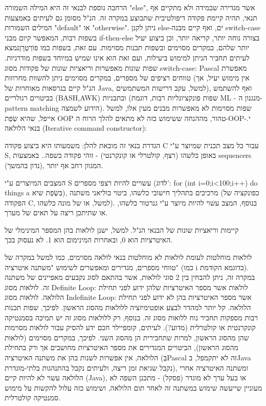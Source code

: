         הרחבה נוספת לבנאי זה היא המילה השמורה "else", אשר מגדירה שבמידה ולא מתקיים אף
        תנאי, תהיה קיימת פקודה דיפולטיבית שתבוצע במקרה זה. הנ"ל מסומן גם לעיתים באמצעות
        המילים השמורות "default" או "otherwise". ניתן לקנן else-ים, ואף קיים מבנה
        switch-case בשפות רבות, המאפשר קיום מבני if-then-else בצורה נוחה יותר, קריאה
        יותר, וכן ביצוע יעיל יותר שלהם, במקרים מסוימים ובשפות תכנות מסוימות. עם זאת,
        בשפות כמו פוֹרְטְרָןנמצא לעיתים תחביר הניתן למימוש ביעילות, ועם זאת הוא אינו שמיש
        במיוחד בשפות מודרניות. שפות שונות מאפשרות וריאציות שונות של פקודות מסוג
        switch-case: Pascal מאפשרת טווחים רציפים של מספרים, במקרים מסוימים ניתן להשוות
        מחרוזות (אין מימוש יעיל, אך הנ"ל קיים בגרסאות מאוחרות של Java, למשל, עקב דרישות
        המשתמשים), ואף להשתמש בביטויים רגולריים (BASH,AWK) ובתבניות (שפות פונקציונליות
        רבות, דוגמת ML - מנגנון ה- pattern matching הידוע לשמצה). שפות מסוימות לא
        מאפשרות מבנים מעין אלו, למשל אייפל, שהיא שְׂפַת OOP טהור, מההנחה ששימוש כזה לא
        מתאים להלך הרוח ה-OOP-י.
        בנאי הלולאה (Iterative command constructor):

        הגדרת בנאי זה מובאת להלן:
        משמעותו היא ביצוע פקודה C עבור כל מצב תכנית שמיוצר ע"י S, באופן כלשהו (רצף,
        קולטרלי או קונקרנטי) - זוהי פקודה בשפה.. באמצעות sequencers (נדון בהמשך),
        המגוון רחב אף יותר.

        המצבים המיוצרים ע"י S עשויים להיות רצפי מספרים (לדוג': for (int i=0;i<100;i++)
        {do things} a בִּשְׂפַת שיא), מרכיבים בתהליך חישובי כלשהו, ביטוי בוליאני משתנה
        (כפונקציה של הפקודה C, למשל, או של מונה כלשהו). בנוסף, המצב עשוי להיות מיוצר
        ע"י גנרטור כלשהו, או שתיתכן ריצה על תאים של מערך.

        קיימות וריאציות שונות של הבנאי הנ"ל. למשל, ישנן לולאות בהן המספר המינימלי של
        האיטרציות הוא 0, ובאחרות המינימום הוא 1. לא נעסוק בכך.

        לולאות מוחלטות לעומת לולאות לא מוחלטות
        בנאי לולאה מסוימים, כמו למשל במקרה של טווחי מספרים, מגדירים ומאפשרים לשימוש
        "משתנה איטרציה" (כמו i בדוגמא הקודמת). במקרה זה, ניתן להבחין בין 2 סוגי לולאות,
        אשר בהתאם לסוג נקבעים מאפיינים של משתנה זה. לולאות מסוג Definite Loop: לולאות
        אשר מספר האיטרציות שלהן ידוע לפני תחילת הלולאה.
        לולאות מסוג Indefinite Loop: אשר מספר האיטרציות בהן לא ידוע לפני תחילת הלולאה.
        קל יותר למהדר לבצע אופטימיזציה ללולאות מהסוג הראשון. לפיכך, שפות תכנות רבות מספקות תחביר נוח ללואות מסוג זה. בנוסף, רק ללולאות מסוג זה יש תמיכה בסמנטיקה קונקרנטית או קולטרלית (מדוע?). לעיתים, קומפיילר חכם ידע להסיק עבור לולאות מסוימות שהן מהסוג הראשון, למרות שתחבירית הן מהסוג השני.
        לפיכך, במקרים מסוימים (לולאות מהסוג הראשון), הביטויים המגדירים את מספר האיטרציות מחושבים אך ורק בתחילת הלולאה, אין אפשרות לשנות בהן את משתנה האיטרציה (בְּPascal זה לא יתקמפל, בJava נקבל שגיאת זמן ריצה, ולעיתים נקבל בהתנהגות בלתי-מוגדרת), ומשתנה האיטרציה אחרי הלולאה עשוי לא להיות קיים (Java), או בעל ערך לא מוגדר (פסקל) - מתכנן השפה לא מעוניין שייעשה שימוש במשתנה זה לאחר תום הלולאה, ושימוש כזה עלול להקשות על מימוש סמנטיקה קולטרלית.

